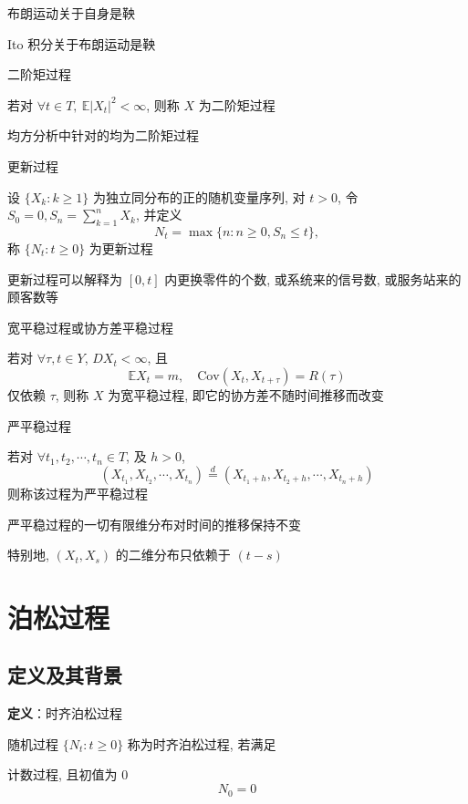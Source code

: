 \documentclass[openany]{ctexbook}
\theoremstyle{kaiti}
\theoremstyle{normal}
\begin{document}
 布朗运动关于自身是鞅

 Ito 积分关于布朗运动是鞅

二阶矩过程

 若对 $\forall t\in T,~\mathbb{E}|X_t|^2<\infty$, 则称 $X$ 为二阶矩过程

 均方分析中针对的均为二阶矩过程

更新过程

 设 $\{X_k:k\geqslant1\}$ 为独立同分布的正的随机变量序列, 对 $t>0$, 令 $S_0=0, S_n=\sum_{k=1}^nX_k$, 并定义
\begin{equation}
  N_t=\max\{n:n\geqslant0,S_n\leqslant t\},
\end{equation}
 称 $\{N_t:t\geqslant0\}$ 为更新过程

 更新过程可以解释为 $[0,t]$ 内更换零件的个数, 或系统来的信号数, 或服务站来的顾客数等

宽平稳过程或协方差平稳过程

 若对 $\forall\tau,t\in Y$, $DX_t<\infty$, 且
\begin{equation}
  \mathbb{E}X_t=m,\quad\mathrm{Cov}(X_t,X_{t+\tau})=R(\tau)
\end{equation}
 仅依赖 $\tau$, 则称 $X$ 为宽平稳过程, 即它的协方差不随时间推移而改变

严平稳过程

 若对 $\forall t_1,t_2,\cdots,t_n\in T$, 及 $h>0$,
\begin{equation}
  (X_{t_1},X_{t_2},\cdots,X_{t_n})\overset{d}{=}(X_{t_1+h},X_{t_2+h},\cdots,X_{t_n+h})
\end{equation}
 则称该过程为严平稳过程

 严平稳过程的一切有限维分布对时间的推移保持不变

 特别地, $(X_t,X_s)$ 的二维分布只依赖于 $(t-s)$

\chapter{泊松过程}

\section{定义及其背景}
  
\textbf{定义}：时齐泊松过程
  
  随机过程 $\{N_t:t\geqslant0\}$ 称为时齐泊松过程, 若满足

 计数过程, 且初值为 $0$
\begin{equation}
    N_0=0
\end{equation}
  
\end{document}
